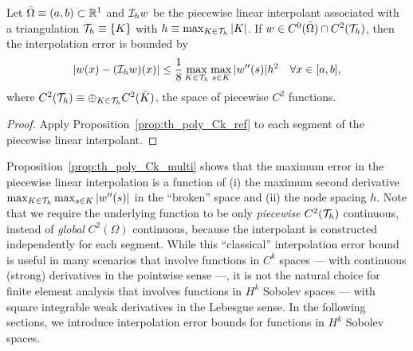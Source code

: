 \begin{proposition}
  \label{prop:th_poly_Ck_multi}
  Let $\bar \Omega \equiv (a,b) \subset \mathbb{R}^1$ and $\mathcal{I}_h w$ be the piecewise linear interpolant associated with a triangulation $\mathcal{T}_h \equiv \{ K \}$ with $h \equiv \max_{K \in \mathcal{T}_h} |K|$.
  If $w \in C^0(\bar \Omega) \cap C^2(\mathcal{T}_h)$, then the interpolation error is bounded by
  \begin{equation*}
    | w(x) - (\mathcal{I}_h w)(x) | \leq \frac{1}{8} \max_{K \in \mathcal{T}_h} \max_{s \in K} |w''(s)| h^2 \quad \forall x \in [a,b],
  \end{equation*}
  where $C^2(\mathcal{T}_h) \equiv \oplus_{K \in \mathcal{T}_h} C^2(\bar K)$, the space of piecewise $C^2$ functions.
  \begin{proof}
    Apply Proposition~\ref{prop:th_poly_Ck_ref} to each segment of the piecewise linear interpolant.
  \end{proof}
\end{proposition}
Proposition~\ref{prop:th_poly_Ck_multi} shows that the maximum error in the piecewise linear interpolation is a function of (i) the maximum second derivative $\max_{K \in \mathcal{T}_h} \max_{s \in K} |w''(s)|$ in the ``broken'' space and (ii) the node spacing $h$.  Note that we require the underlying function to be only \emph{piecewise} $C^2(\mathcal{T}_h)$ continuous, instead of \emph{global} $C^2(\Omega)$ continuous, because the interpolant is constructed independently for each segment.  While this ``classical'' interpolation error bound is useful in many scenarios that involve functions in $C^k$ spaces --- with continuous (strong) derivatives in the pointwise sense  ---, it is not the natural choice for finite element analysis that involves functions in $H^k$ Sobolev spaces --- with square integrable weak derivatives in the Lebesgue sense.  In the following sections, we introduce interpolation error bounds for functions in $H^k$ Sobolev spaces.

